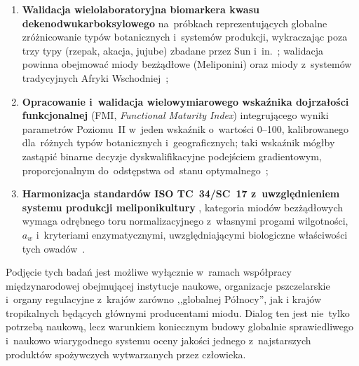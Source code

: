 \begin{enumerate}
    \item \textbf{Walidacja wielolaboratoryjna biomarkera
          kwasu dekenodwukarboksylowego} na~próbkach
          reprezentujących globalne zróżnicowanie typów
          botanicznych i~systemów produkcji, wykraczając
          poza trzy typy (rzepak, akacja, jujube) zbadane
          przez Sun i~in.~\cite{sun2021}; walidacja
          powinna obejmować miody bezżądłowe (Meliponini)
          oraz miody z~systemów tradycyjnych Afryki
          Wschodniej~\cite{tadele2025};


    \item \textbf{Opracowanie i~walidacja wielowymiarowego
          wskaźnika dojrzałości funkcjonalnej} (FMI,
          \textit{Functional Maturity Index}) integrującego
          wyniki parametrów Poziomu~II w~jeden wskaźnik
          o~wartości 0--100, kalibrowanego dla~różnych
          typów botanicznych i~geograficznych; taki wskaźnik
          mógłby zastąpić binarne decyzje dyskwalifikacyjne
          podejściem gradientowym, proporcjonalnym
          do~odstępstwa od~stanu optymalnego~\cite{zhang2021,guo2020,sun2021};


    \item \textbf{Harmonizacja standardów ISO TC~34/SC~17
          z~uwzględnieniem systemu produkcji meliponikultury}
         , kategoria miodów bezżądłowych wymaga odrębnego
          toru normalizacyjnego z~własnymi progami
          wilgotności, $a_w$ i~kryteriami enzymatycznymi,
          uwzględniającymi biologiczne właściwości
          tych owadów~\cite{stinglessyeastbrazil2021,stinglesswjava2024}.
\end{enumerate}

Podjęcie tych badań jest możliwe wyłącznie w~ramach
współpracy międzynarodowej obejmującej instytucje naukowe,
organizacje pszczelarskie i~organy regulacyjne z~krajów
zarówno ,,globalnej Północy'', jak i krajów tropikalnych będących głównymi producentami miodu. Dialog ten jest nie~tylko potrzebą naukową,
lecz warunkiem koniecznym budowy globalnie sprawiedliwego i~naukowo wiarygodnego systemu oceny jakości jednego
z~najstarszych produktów spożywczych wytwarzanych przez człowieka.